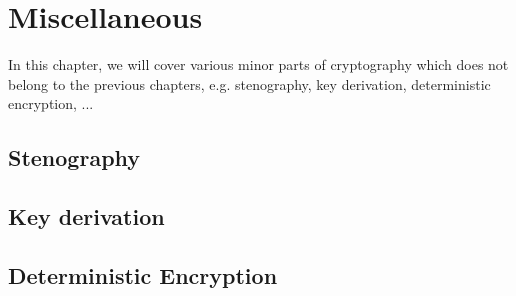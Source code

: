 \chapter{Miscellaneous}

In this chapter, we will cover various minor parts of cryptography which does not belong to the previous chapters, e.g. stenography, key derivation, deterministic encryption, ...

\section{Stenography}

\section{Key derivation}

\section{Deterministic Encryption}